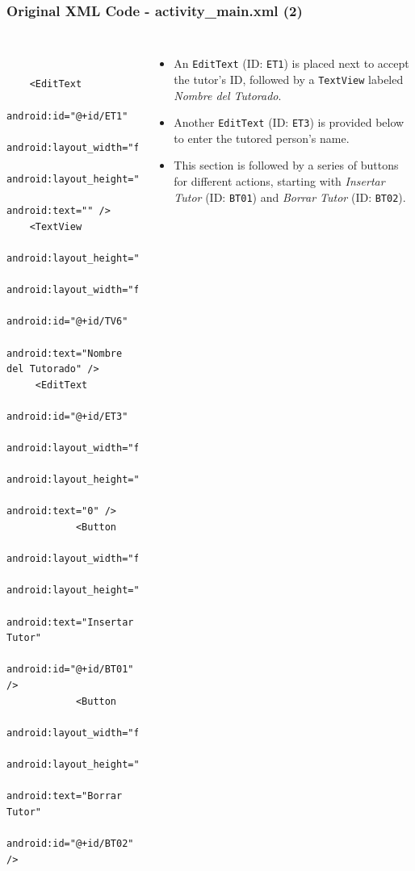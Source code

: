 \documentclass[pdf,
serif,
compress,
xcolor=table,
dvipsnames,
spanish,
aspectratio=169]{beamer}
\begin{document}
\begin{frame}[fragile]
    \frametitle{Original XML Code - activity\_main.xml (2)}    


\begin{columns}
    \begin{verbatim}


    <EditText    
        android:id="@+id/ET1"        
        android:layout_width="fill_parent"
        android:layout_height="wrap_content"
        android:text="" />
    <TextView
        android:layout_height="wrap_content"
        android:layout_width="fill_parent"
        android:id="@+id/TV6"
        android:text="Nombre del Tutorado" />
     <EditText
        android:id="@+id/ET3"
        android:layout_width="fill_parent"
        android:layout_height="wrap_content"
        android:text="0" />
	        <Button
	            android:layout_width="fill_parent"
	            android:layout_height="fill_parent"
	            android:text="Insertar Tutor"
	            android:id="@+id/BT01"   />
	        <Button
	            android:layout_width="fill_parent"
	            android:layout_height="fill_parent"
	            android:text="Borrar Tutor"
	            android:id="@+id/BT02"   />	        	        
	        

    \end{verbatim}
\begin{itemize}\tiny
        \item An \texttt{EditText} (ID: \texttt{ET1}) is placed next to accept the tutor's ID, followed by a \texttt{TextView} labeled \emph{Nombre del Tutorado}.
        \item Another \texttt{EditText} (ID: \texttt{ET3}) is provided below to enter the tutored person's name.
        \item This section is followed by a series of buttons for different actions, starting with \emph{Insertar Tutor} (ID: \texttt{BT01}) and \emph{Borrar Tutor} (ID: \texttt{BT02}).
    \end{itemize}
\end{columns}  
\end{frame}
\end{document}

